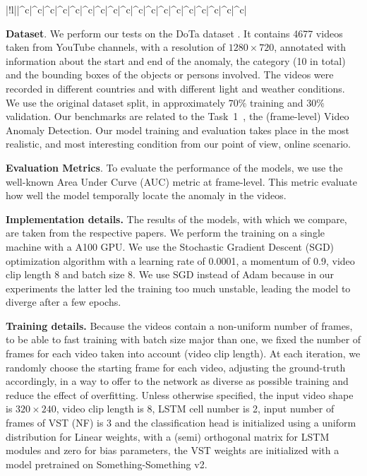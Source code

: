 \begin{table}[ht]
\begin{center}
\begin{tabular}{|!l||^c|^c|^c|^c|^c|^c|^c|^c|^c|^c|^c|^c|^c|^c|^c|^c|^c|^c|}
        \hline
\end{tabular}
	\end{center}
	\caption{Detection accuracy for each individual accident category (AUC) on VAD task. "*" indicates non-ego anomaly categories. "**" indicates input video resolution is $640\times480$ instead of $320\times240$. N.D. (Not Defined): means no value is available on paper that describes the corresponding model. Bold and red values are respectively the best and second-best results.}
	\label{tab:sota-vad-auc-per-class}
\end{table}

\noindent\textbf{Dataset}.
We perform our tests on the DoTa dataset \cite{9712446}.
It contains 4677 videos taken from YouTube channels, with a resolution of $1280 \times 720$, annotated with information about the start and end of the anomaly, the category (10 in total) and the bounding boxes of the objects or persons involved.
The videos were recorded in different countries and with different light and weather conditions.
We use the original dataset split, in approximately $70\%$ training and $30\%$ validation.
Our benchmarks are related to the Task~1~\cite{9712446}, the (frame-level) Video Anomaly Detection.
Our model training and evaluation takes place in the most realistic, and most interesting condition from our point of view, online scenario.

\noindent\textbf{Evaluation Metrics}.
To evaluate the performance of the models, we use the well-known Area Under Curve (AUC) metric at frame-level.
This metric evaluate how well the model temporally locate the anomaly in the videos. 

\noindent\textbf{Implementation details.}
The results of the models, with which we compare, are taken from the respective papers.
We perform the training on a single machine with a A100 GPU.
We use the Stochastic Gradient Descent (SGD) optimization algorithm with a learning rate of 0.0001, a momentum of 0.9, video clip length 8 and batch size 8.
We use SGD instead of Adam because in our experiments the latter led the training too much unstable, leading the model to diverge after a few epochs.

\noindent\textbf{Training details.}
Because the videos contain a non-uniform number of frames, to be able to fast training with batch size major than one, we fixed the number of frames for each video taken into account (video clip length).
At each iteration, we randomly choose the starting frame for each video, adjusting the ground-truth accordingly, in a way to offer to the network as diverse as possible training and reduce the effect of overfitting.
Unless otherwise specified, the input video shape is $320 \times 240$, video clip length is 8, LSTM cell number is 2, input number of frames of VST (NF) is 3 and the classification head is initialized using a uniform distribution for Linear weights, with a (semi) 
orthogonal matrix for LSTM modules and zero for bias parameters, the VST weights are initialized with a model pretrained on Something-Something v2.

